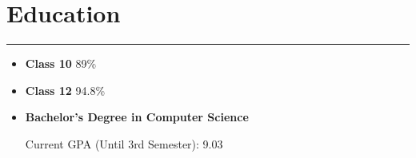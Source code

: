 \documentclass[letterpaper, 10pt]{article}
\begin{document}
\section*{Education}
\hrule
\vspace{4pt}

\begin{itemize}

\item[]
\textbf{Class 10} \hfill 89\%

\item[]
\textbf{Class 12} \hfill 94.8\%

\item[]
\textbf{Bachelor's Degree in Computer Science}

Current GPA (Until 3rd Semester): 9.03

\end{itemize}

\end{document}
